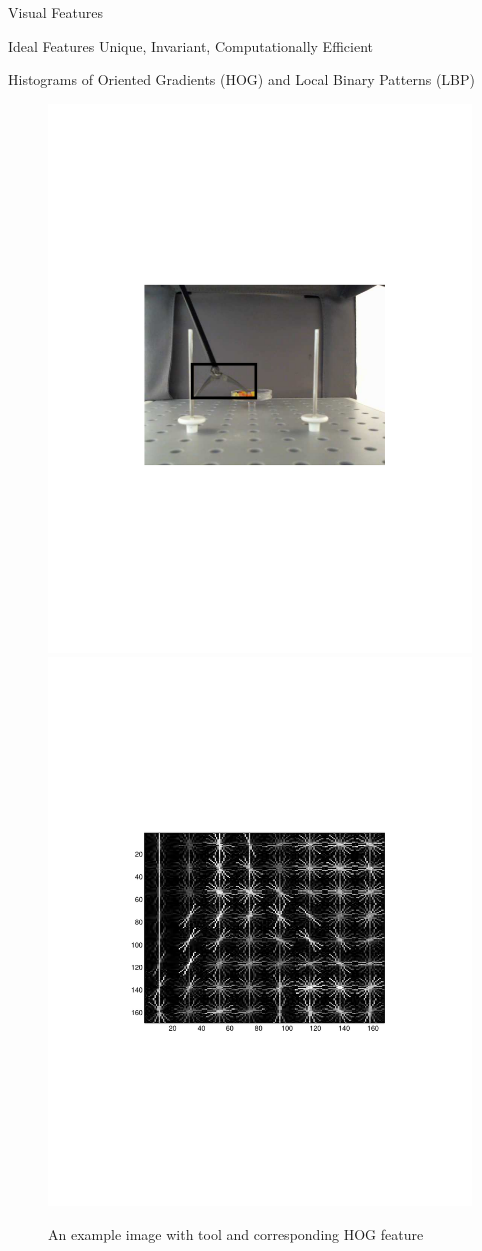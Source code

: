\begin{frame}{Visual Features}
\begin{block}{Ideal Features}
Unique, Invariant, Computationally Efficient
\end{block}
Histograms of Oriented Gradients (HOG) and Local Binary Patterns (LBP)
\begin{figure}
\centering
\includegraphics[width=0.45\linewidth,trim=40mm 106mm 80mm 100mm,clip]{figures/surgical/feature_pic}
\includegraphics[width=0.45\linewidth,trim=50mm 93mm 40mm 70mm,clip]{figures/surgical/feature_pic_hog}
\caption{An example image with tool and corresponding HOG feature} \label{fig:hog}
\end{figure}
\end{frame}

